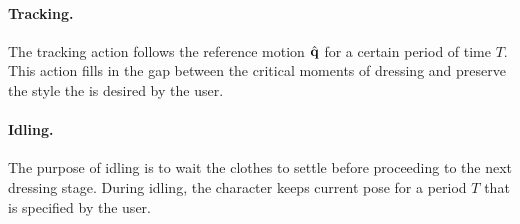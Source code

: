 \paragraph{Tracking.} The tracking action follows the reference motion $\hat{\mathbf{q}}$ for a certain period of time $T$. This action fills in the gap between the critical moments of dressing and preserve the style the is desired by the user.

\paragraph{Idling.} The purpose of idling is to wait the clothes to settle before proceeding to the next dressing stage. During idling, the character keeps current pose for a period $T$ that is specified by the user.

